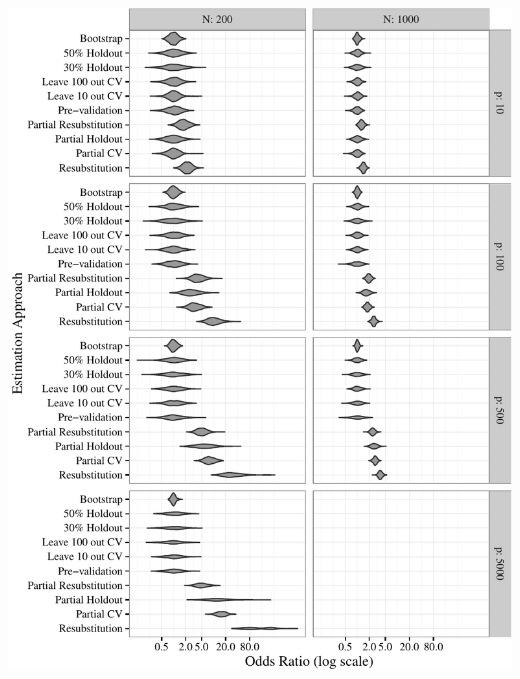 \documentclass[11pt,]{article}
\begin{document}
\includegraphics{supplement_files/figure-latex/unnamed-chunk-1-1.pdf}


\end{document}
